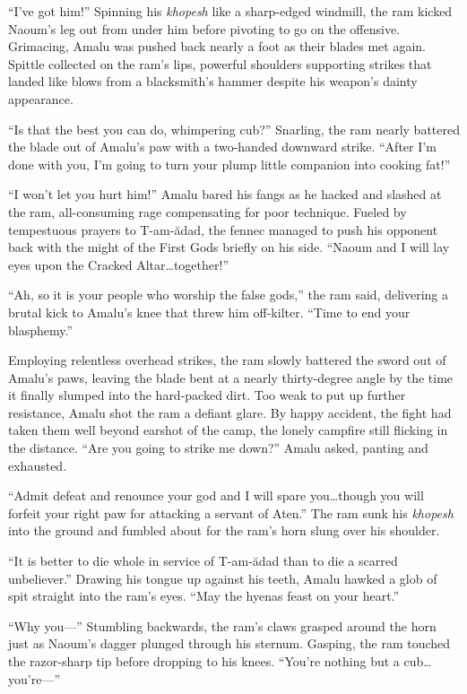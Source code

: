 ``I've got him!'' Spinning his \emph{khopesh} like a sharp-edged windmill, the ram kicked Naoum's leg out from under him before pivoting to go on the offensive. Grimacing, Amalu was pushed back nearly a foot as their blades met again. Spittle collected on the ram's lips, powerful shoulders supporting strikes that landed like blows from a blacksmith's hammer despite his weapon's dainty appearance.

``Is that the best you can do, whimpering cub?'' Snarling, the ram nearly battered the blade out of Amalu's paw with a two-handed downward strike. ``After I'm done with you, I'm going to turn your plump little companion into cooking fat!''

``I won't let you hurt him!'' Amalu bared his fangs as he hacked and slashed at the ram, all-consuming rage compensating for poor technique. Fueled by tempestuous prayers to T-am-ădad, the fennec managed to push his opponent back with the might of the First Gods briefly on his side. ``Naoum and I will lay eyes upon the Cracked Altar\ldots{}together!''

``Ah, so it is your people who worship the false gods,'' the ram said, delivering a brutal kick to Amalu's knee that threw him off-kilter. ``Time to end your blasphemy.''

Employing relentless overhead strikes, the ram slowly battered the sword out of Amalu's paws, leaving the blade bent at a nearly thirty-degree angle by the time it finally slumped into the hard-packed dirt. Too weak to put up further resistance, Amalu shot the ram a defiant glare. By happy accident, the fight had taken them well beyond earshot of the camp, the lonely campfire still flicking in the distance. ``Are you going to strike me down?'' Amalu asked, panting and exhausted.

``Admit defeat and renounce your god and I will spare you\ldots{}though you will forfeit your right paw for attacking a servant of Aten.'' The ram sunk his \emph{khopesh} into the ground and fumbled about for the ram's horn slung over his shoulder.

``It is better to die whole in service of T-am-ădad than to die a scarred unbeliever.'' Drawing his tongue up against his teeth, Amalu hawked a glob of spit straight into the ram's eyes. ``May the hyenas feast on your heart.''

``Why you---'' Stumbling backwards, the ram's claws grasped around the horn just as Naoum's dagger plunged through his sternum. Gasping, the ram touched the razor-sharp tip before dropping to his knees. ``You're nothing but a cub\ldots{}you're---''

